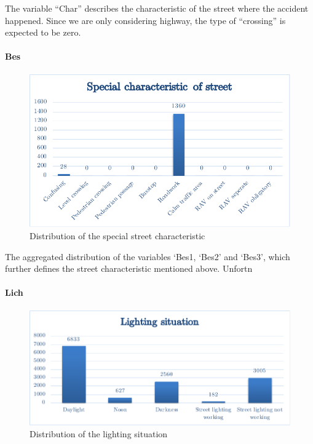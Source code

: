 \documentclass[a4paper,12pt]{report}
\begin{document}
The variable “Char” describes the characteristic of the street where the accident happened. Since we are only considering highway, the type of “crossing” is expected to be zero. 

\paragraph{Bes}
\begin{figure}[h]
	\centering
	\includegraphics[scale=0.6]{./assets/baysis_dataset_Bes.pdf}
	\caption{Distribution of the special street characteristic}
	\label{img:baysis_dataset_Bes}
\end{figure}

The aggregated distribution of the variables ‘Bes1, ‘Bes2’ and ‘Bes3’, which further defines the street characteristic mentioned above. Unfortn

\paragraph{Lich}
\begin{figure}[h]
	\centering
	\includegraphics[scale=0.6]{./assets/baysis_dataset_Lich.pdf}
	\caption{Distribution of the lighting situation}
	\label{img:baysis_dataset_Lich}
\end{figure}
\end{document}
